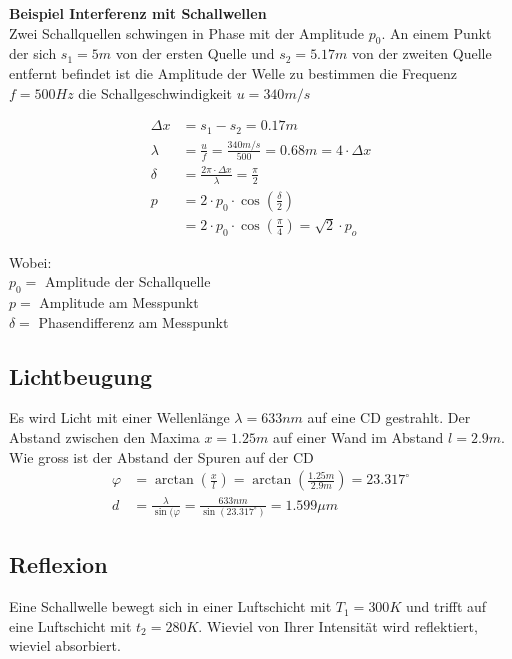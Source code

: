 \newpage

\textbf{Beispiel Interferenz mit Schallwellen}\\
Zwei Schallquellen schwingen in Phase mit der Amplitude $p_0$. An einem Punkt der sich $s_1 = 5m$ von der ersten Quelle und $s_2 = 5.17m$ von der zweiten Quelle entfernt befindet ist die Amplitude der Welle zu bestimmen die Frequenz $f = 500 Hz$ die Schallgeschwindigkeit $u= 340m/s$

\begin{minipage}{0.6\textwidth}
\begin{align*}
	\Delta x &= s_1-s_2 = 0.17m\\
	\lambda&= \frac{u}{f} = \frac{340m/s}{500} = 0.68m = 4\cdot \Delta x\\
	\delta &= \frac{2\pi\cdot \Delta x}{\lambda} = \frac{\pi}{2}\\
	p&= 2\cdot p_0 \cdot \cos\left(\frac{\delta}{2}\right)\\
	&= 2\cdot p_0\cdot \cos \left(\frac{\pi}{4}\right) = \sqrt{2} \cdot p_o	
\end{align*}
\end{minipage}
\begin{minipage}{0.39\textwidth}
Wobei:\\
$p_0 = $ Amplitude der Schallquelle\\
$p = $ Amplitude am Messpunkt\\
$\delta = $ Phasendifferenz am Messpunkt\\

\end{minipage}



\subsection{Lichtbeugung}
Es wird Licht mit einer Wellenlänge $\lambda = 633nm$ auf eine CD gestrahlt. Der Abstand zwischen den Maxima $x=1.25m$ auf einer Wand im Abstand $l=2.9m$. Wie gross ist der Abstand der Spuren auf der CD
\begin{align*}
\varphi &=\arctan\left(\frac{x}{l}\right) = \arctan\left(\frac{1.25m}{2.9m}\right) = 23.317^\circ\\
d&=\frac{\lambda}{\sin(\varphi} = \frac{633nm}{\sin(23.317^\circ)} = 1.599\mu m
\end{align*} 


\subsection{Reflexion}
Eine Schallwelle bewegt sich in einer Luftschicht mit $T_1=300K$ und trifft auf eine Luftschicht mit $t_2 = 280K$. Wieviel von Ihrer Intensität wird reflektiert, wieviel absorbiert.

